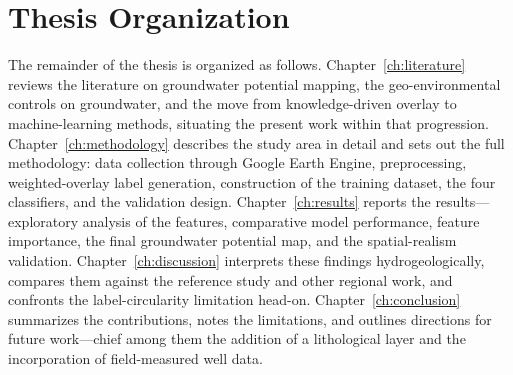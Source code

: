 \section{Thesis Organization}
\label{sec:organization}

The remainder of the thesis is organized as follows.
Chapter~\ref{ch:literature} reviews the literature on groundwater potential
mapping, the geo-environmental controls on groundwater, and the move from
knowledge-driven overlay to machine-learning methods, situating the present work
within that progression. Chapter~\ref{ch:methodology} describes the study area in
detail and sets out the full methodology: data collection through Google Earth
Engine, preprocessing, weighted-overlay label generation, construction of the
training dataset, the four classifiers, and the validation design.
Chapter~\ref{ch:results} reports the results---exploratory analysis of the
features, comparative model performance, feature importance, the final
groundwater potential map, and the spatial-realism validation.
Chapter~\ref{ch:discussion} interprets these findings hydrogeologically, compares
them against the reference study and other regional work, and confronts the
label-circularity limitation head-on. Chapter~\ref{ch:conclusion} summarizes the
contributions, notes the limitations, and outlines directions for future
work---chief among them the addition of a lithological layer and the
incorporation of field-measured well data.
